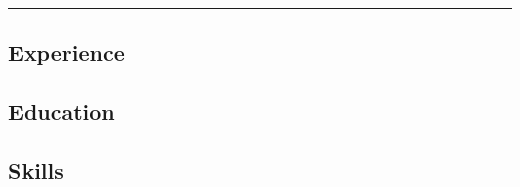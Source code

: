 \documentclass[10pt,letterpaper]{article}
\begin{document}
\myheader

\vspace{-0.1in}\hrule

\subsection*{Experience}
\myexperience

\subsection*{Education}
\myeducation

\subsection*{Skills}
\myskills

\end{document}
